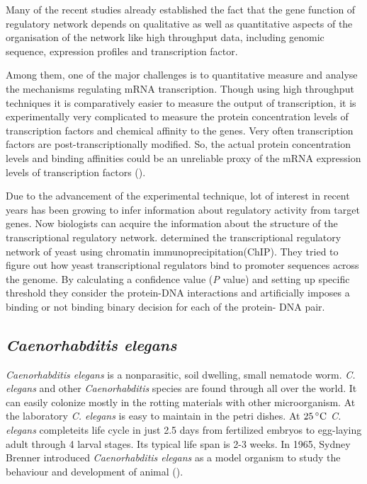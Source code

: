 Many of the recent studies already established the fact that the gene function of regulatory network depends on qualitative as well as quantitative aspects of the organisation of the network like high throughput data, including genomic sequence, expression profiles and transcription factor.

Among them, one of the major challenges is to quantitative measure and analyse the mechanisms regulating mRNA transcription. Though using high throughput techniques it is comparatively easier to measure the output of transcription, it is experimentally very complicated to measure the protein concentration levels of transcription factors and chemical affinity to the genes. Very often transcription factors are post-transcriptionally modified. So, the actual protein concentration levels and binding affinities could be an unreliable proxy of the mRNA expression levels of transcription factors (\cite{Sanguinetti:2006}).

Due to the advancement of the experimental technique, lot of interest in recent years has been growing to infer information about regulatory activity from target genes. Now biologists can acquire the information about the structure of the transcriptional regulatory network. \cite{Lee:2002} determined the transcriptional regulatory network of yeast using chromatin immunoprecipitation(ChIP). They tried to figure out how yeast transcriptional regulators bind to promoter sequences across the genome. By calculating a confidence value (\textit{P} value) and setting up specific threshold they consider the protein-DNA interactions and artificially imposes a binding or not binding binary decision for each of the protein- DNA pair.

\subsection{\textit{Caenorhabditis elegans}}
\textit{Caenorhabditis elegans} is a nonparasitic, soil dwelling, small nematode worm. \textit{C. elegans} and other \textit{Caenorhabditis} species are found through all over the world. It can easily colonize mostly in the rotting materials with other microorganism. At the laboratory \textit{C. elegans} is easy to maintain in the petri dishes. At $25\,^{\circ}{\rm C}$ \textit{C. elegans} completeits life cycle in just 2.5 days from fertilized embryos to egg-laying adult through 4 larval stages. Its typical life span is 2-3 weeks. In 1965, Sydney Brenner introduced \textit{Caenorhabditis elegans} as a model organism to study the behaviour and development of animal (\cite{Brenner:1974}).

